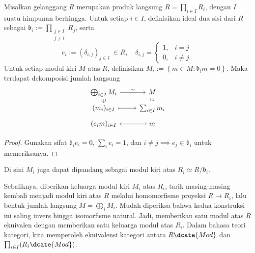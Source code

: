 \begin{lemma}\label{prop:prod-module}
	Misalkan gelanggang $R$ merupakan produk langsung $R = \prod_{i \in I} R_i$, dengan $I$ suatu himpunan berhingga. Untuk setiap $i \in I$, definisikan ideal dua sisi dari $R$ sebagai $\mathfrak{b}_i := \prod_{\substack{j \in I \\ j \neq i}} R_j$, serta
	\[ e_i := (\delta_{i,j})_{j \in I} \; \in R, \quad \delta_{i,j} = \begin{cases} 1, & i=j \\ 0, & i \neq j. \end{cases} \]
	Untuk setiap modul kiri $M$ atas $R$, definisikan $M_i := \left\{ m \in M : \mathfrak{b}_i m = 0 \right\}$. Maka terdapat dekomposisi jumlah langsung
	\begin{equation*}\begin{tikzcd}[row sep=tiny]
		\bigoplus_{i \in I} M_i \arrow[r, "\sim"] & M \\
		(m_i)_{i \in I} \arrow[mapsto, r] \arrow[phantom, u, "\in" description, sloped] & \sum_{i \in I} m_i \arrow[phantom, u, "\in" description, sloped] \\
		(e_i m)_{i \in I} & m \arrow[mapsto, l]
	\end{tikzcd}\end{equation*}
\end{lemma}
\begin{proof}
	Gunakan sifat $\mathfrak{b}_i e_i = 0$, $\sum_i e_i = 1$, dan $i \neq j \implies e_j \in \mathfrak{b}_i$ untuk memeriksanya.
\end{proof}
Di sini $M_i$ juga dapat dipandang sebagai modul kiri atas $R_i \simeq R/\mathfrak{b}_i$.
\begin{remark}
	Sebaliknya, diberikan keluarga modul kiri $M_i$ atas $R_i$, tarik masing-masing kembali menjadi modul kiri atas $R$ melalui homomorfisme proyeksi $R \to R_i$, lalu bentuk jumlah langsung $M = \bigoplus_i M_i$. Mudah diperiksa bahwa kedua konstruksi ini saling invers hingga isomorfisme natural. Jadi, memberikan satu modul atas $R$ ekuivalen dengan memberikan satu keluarga modul atas $R_i$. Dalam bahasa teori kategori, kita memperoleh ekuivalensi kategori antara $R\dcate{Mod}$ dan $\prod_{i \in I} (R_i\dcate{Mod})$.
\end{remark}
 
 
